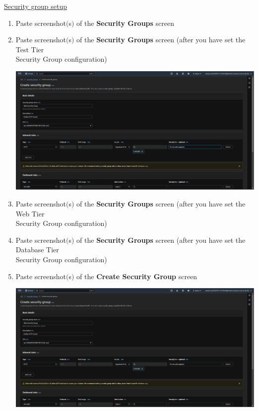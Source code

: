 \documentclass[11pt]{article}
\begin{document}
\noindent\underline{Security group setup}
\begin{enumerate}[resume]
    \item Paste screenshot$($s$)$ of the \textbf{Security Groups} screen \\

    \item Paste screenshot$($s$)$ of the \textbf{Security Groups} screen (after you have set the Test Tier\\ Security Group configuration)\\
    \vspace{5mm}

    {\centering
    \includegraphics[width=5.8in]{pics/11.png}
    }


    \item Paste screenshot$($s$)$ of the \textbf{Security Groups} screen (after you have set the Web Tier \\ Security Group configuration)\\


    \item Paste screenshot$($s$)$ of the \textbf{Security Groups} screen (after you have set the Database Tier\\ Security Group configuration) \\
    
    \item Paste screenshot$($s$)$ of the \textbf{Create Security Group} screen  \\
    \vspace{5mm}

    {\centering
    \includegraphics[width=5.8in]{pics/12_a.png}
    }

\end{enumerate}
\end{document}
